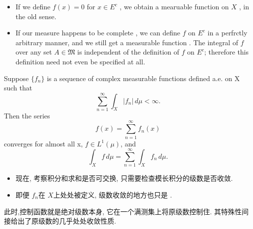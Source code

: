 \documentclass[../main.tex]{subfiles}
\begin{document}
\begin{remark}
    \begin{itemize}
        \item If we define \(  f\left( x \right)= 0   \) for \(  x \in E^{c}   \) , we obtain a mearuable function on \(  X  \) , in the old sense. 
        \item If our measure happens to be complete , we can define \(  f  \) on \(  E^{c}  \) in a perfrctly arbitrary manner, and we still get a measurable function . The integral of \(  f  \) over any set \(  A \in \mathfrak{M}  \) is independent of the definition of \(  f  \) on \(  E^{c}  \); therefore this definition need not even be specified at all.       
    \end{itemize}
       
\end{remark}
\begin{theorem}{}{}
Suppose $\{f_n\}$ is a sequence of complex measurable functions defined a.e. on X such that
\[
\sum_{n=1}^{\infty} \int_X |f_n| \, d\mu < \infty.
\tag{1}
\]
Then the series
\[
f(x) = \sum_{n=1}^{\infty} f_n(x)
\tag{2}
\]
converges for almost all x, $f \in L^1(\mu)$, and
\[
\int_X f \, d\mu = \sum_{n=1}^{\infty} \int_X f_n \, d\mu.
\tag{3}
\]
\end{theorem}
\begin{remark}
    \begin{itemize}
        \item 现在, 考察积分和求和是否可交换, 只需要检查模长积分的级数是否收敛. 
        \item 即便 \(  f_{n}  \)在 \(  X  \)上处处被定义, 级数收敛的地方也只是 .   
    \end{itemize}
    
\end{remark}
\begin{note}
    此时,控制函数就是绝对级数本身, 它在一个满测集上将原级数控制住. 其特殊性间接给出了原级数的几乎处处收敛性质. 
\end{note}
\end{document}
